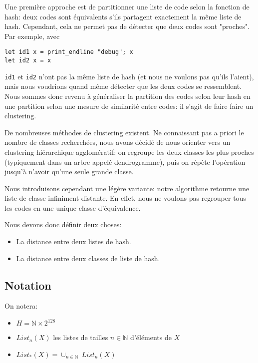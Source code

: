 
Une première approche est de partitionner une liste de code selon la fonction de hash: deux codes sont équivalents s'ils partagent exactement la même liste de hash. Cependant, cela ne permet pas de détecter que deux codes sont "proches". Par exemple, avec

\begin{verbatim}
let id1 x = print_endline "debug"; x
let id2 x = x
\end{verbatim}

\verb|id1| et \verb|id2| n'ont pas la même liste de hash (et nous ne voulons pas qu'ils l'aient), mais nous voudrions quand même détecter que les deux codes se ressemblent. Nous sommes donc revenu à généraliser la partition des codes selon leur hash en une partition selon une mesure de similarité entre codes: il s'agit de faire faire un clustering.

De nombreuses méthodes de clustering existent. Ne connaissant pas a priori le nombre de classes recherchées, nous avons décidé de nous orienter vers un clustering hiérarchique agglomératif: on regroupe les deux classes les plus proches (typiquement dans un arbre appelé dendrogramme), puis on répète l'opération jusqu'à n'avoir qu'une seule grande classe.

Nous introduisons cependant une légère variante: notre algorithme retourne une liste de classe infiniment distante. En effet, nous ne voulons pas regrouper tous les codes en une unique classe d'équivalence.

Nous devons donc définir deux choses:
\begin{itemize}
\item La distance entre deux listes de hash.
\item La distance entre deux classes de liste de hash.
\end{itemize}

\subsection{Notation}
On notera:

\begin{itemize}
\item $H = \mathbb{N} \times 2^{128}$
\item $List_n(X)$ les listes de tailles $n \in \mathbb{N}$ d'éléments de $X$
\item $List_*(X) = \cup_{n\in\mathbb{N}}\ List_n(X)$
\end{itemize}


